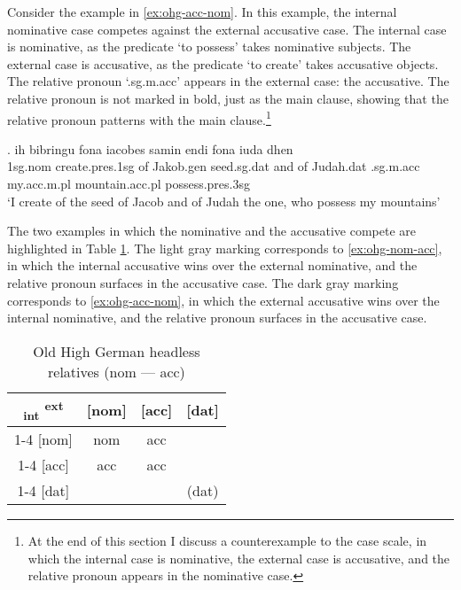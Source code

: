 Consider the example in \ref{ex:ohg-acc-nom}. In this example, the internal nominative case competes against the external accusative case.
The internal case is nominative, as the predicate  `to possess' takes nominative subjects.
The external case is accusative, as the predicate  `to create' takes accusative objects.
The relative pronoun  `.\ac{sg}.\ac{m}.\ac{acc}' appears in the external case: the accusative. The relative pronoun is not marked in bold, just as the main clause, showing that the relative pronoun patterns with the main clause.\footnote{
At the end of this section I discuss a counterexample to the case scale, in which the internal case is nominative, the external case is accusative, and the relative pronoun appears in the nominative case.
}

\exg. ih bibringu fona iacobes samin endi fona iuda dhen   \\
1\ac{sg}.\ac{nom} {create}.\ac{pres}.1\ac{sg}\scsub{[acc]} of Jakob.\ac{gen} seed.\ac{sg}.\ac{dat} and of Judah.\ac{dat} .\ac{sg}.\ac{m}.\ac{acc} my.\ac{acc}.\ac{m}.\ac{pl} mountain.\ac{acc}.\ac{pl} possess.\ac{pres}.3\ac{sg}\scsub{[nom]}\\
`I create of the seed of Jacob and of Judah the one, who possess my mountains' \label{ex:ohg-acc-nom}

The two examples in which the nominative and the accusative compete are highlighted in Table \ref{tbl:summary-old-high-german-nom-acc}. The light gray marking corresponds to \ref{ex:ohg-nom-acc}, in which the internal accusative wins over the external nominative, and the relative pronoun surfaces in the accusative case. The dark gray marking corresponds to \ref{ex:ohg-acc-nom}, in which the external accusative wins over the internal nominative, and the relative pronoun surfaces in the accusative case.

\begin{table}[ht]
  \center
  \caption{Old High German headless relatives (\ac{nom} --- \ac{acc})}
  \begin{tabular}{c|c|c|c}
    \toprule
        \textsubscript{\ac{int}} \textsuperscript{\ac{ext}}
          & [\ac{nom}]
          & [\ac{acc}]
          & [\ac{dat}]
          \\ \cmidrule{1-4}
      [\ac{nom}]
          & \ac{nom}
          & \cellcolor{DG}\ac{acc}
          &
          \\ \cmidrule{1-4}
      [\ac{acc}]
          & \cellcolor{LG}\ac{acc}
          & \ac{acc}
          &
          \\ \cmidrule{1-4}
      [\ac{dat}]
          &
          &
          & (\ac{dat})
          \\
    \bottomrule
  \end{tabular}
    \label{tbl:summary-old-high-german-nom-acc}
\end{table}

